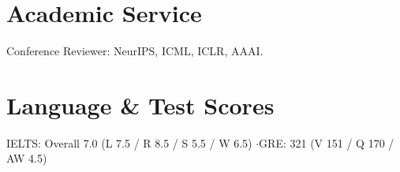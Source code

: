 \documentclass[11pt]{article}
\begin{document}
\section*{Academic Service}
{\color{inkII}\small Conference Reviewer: NeurIPS, ICML, ICLR, AAAI.}

\section*{Language \& Test Scores}
{\color{inkII}\small IELTS: Overall 7.0 (L 7.5 / R 8.5 / S 5.5 / W 6.5) \quad\textcolor{inkIII}{$\cdot$}\quad GRE: 321 (V 151 / Q 170 / AW 4.5)}
\end{document}
